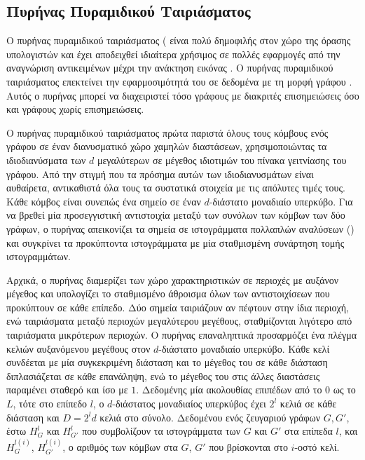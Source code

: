 \subsection{Πυρήνας Πυραμιδικού Ταιριάσματος}
\label{ssec:pm}
Ο πυρήνας πυραμιδικού ταιριάσματος ( είναι πολύ δημοφιλής στον χώρο της όρασης υπολογιστών και έχει αποδειχθεί ιδιαίτερα χρήσιμος σε πολλές εφαρμογές από την αναγνώριση αντικειμένων μέχρι την ανάκτηση εικόνας \cite{grauman2007pyramid,lazebnik2006beyond}.
Ο πυρήνας πυραμιδικού ταιριάσματος επεκτείνει την εφαρμοσιμότητά του σε δεδομένα με τη μορφή γράφου \cite{nikolentzos2017matching}.
Αυτός ο πυρήνας μπορεί να διαχειριστεί τόσο γράφους με διακριτές επισημειώσεις όσο και γράφους χωρίς επισημειώσεις.\par
Ο πυρήνας πυραμιδικού ταιριάσματος πρώτα παριστά όλους τους κόμβους ενός γράφου σε έναν διανυσματικό χώρο χαμηλών διαστάσεων, χρησιμοποιώντας τα ιδιοδιανύσματα των $d$ μεγαλύτερων σε μέγεθος ιδιοτιμών του πίνακα γειτνίασης του γράφου.
Από την στιγμή που τα πρόσημα αυτών των ιδιοδιανυσμάτων είναι αυθαίρετα, αντικαθιστά όλα τους τα συστατικά στοιχεία με τις απόλυτες τιμές τους.
Κάθε κόμβος είναι συνεπώς ένα σημείο σε έναν $d$-διάστατο μοναδιαίο υπερκύβο.
Για να βρεθεί μία προσεγγιστική αντιστοιχία μεταξύ των συνόλων των κόμβων των δύο γράφων, ο πυρήνας απεικονίζει τα σημεία σε ιστογράμματα πολλαπλών αναλύσεων () και συγκρίνει τα προκύπτοντα ιστογράμματα με μία σταθμισμένη συνάρτηση τομής ιστογραμμάτων.\par
Αρχικά, ο πυρήνας διαμερίζει των χώρο χαρακτηριστικών σε περιοχές με αυξάνον μέγεθος και υπολογίζει το σταθμισμένο άθροισμα όλων των αντιστοιχίσεων που προκύπτουν σε κάθε επίπεδο.
Δύο σημεία ταιριάζουν αν πέφτουν στην ίδια περιοχή, ενώ ταιριάσματα μεταξύ περιοχών μεγαλύτερου μεγέθους, σταθμίζονται λιγότερο από ταιριάσματα μικρότερων περιοχών.
Ο πυρήνας επαναληπτικά προσαρμόζει ένα πλέγμα κελιών αυξανόμενου μεγέθους στον $d$-διάστατο μοναδιαίο υπερκύβο.
Κάθε κελί συνδέεται με μία συγκεκριμένη διάσταση και το μέγεθος του σε κάθε διάσταση διπλασιάζεται σε κάθε επανάληψη, ενώ το μέγεθος του στις άλλες διαστάσεις παραμένει σταθερό και ίσο με $1$.
Δεδομένης μία ακολουθίας επιπέδων από το $0$ ως το $L$, τότε στο επίπεδο $l$, ο $d$-διάστατος μοναδιαίος υπερκύβος έχει $2^l$ κελιά σε κάθε διάσταση και $D = 2^{l}d$ κελιά στο σύνολο.
Δεδομένου ενός ζευγαριού γράφων $G,G'$, έστω $H_{G}^{l}$ και $H_{G'}^{l}$ που συμβολίζουν τα ιστογράμματα των $G$ και $G'$ στα επίπεδα $l$, και $H_{G}^{l(i)}$, $H_{G'}^{l(i)}$, ο αριθμός των κόμβων στα $G$, $G'$ που βρίσκονται στο $i$-οστό κελί.
